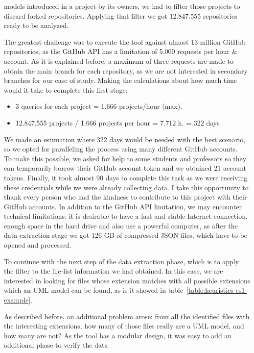 \documentclass[a4paper, 12pt]{book}
\begin{document}
models introduced in a project by its owners, we had to filter those projects to discard forked repositories. Applying that
filter we got 12.847.555 repositories ready to be analyzed.\par
The greatest challenge was to execute the tool against almost 13 million GitHub repositories, as the GitHub API has a limitation
of 5.000 requests per hour \& account. As it is explained before, a maximum of three requests are made to obtain the main
branch for each repository, as we are not interested in secondary branches for our case of study. Making the calculations about
how much time would it take to complete this first stage:
\begin{itemize}
  \item 3 queries for each project = 1.666 projects/hour (max).
  \item 12.847.555 projects / 1.666 projects per hour = 7.712 h. = 322 days
\end{itemize}
We made an estimation where 322 days would be needed with the best scenario, so we opted for paralleling the process using many
different GitHub accounts.\\
To make this possible, we asked for help to some students and professors so they can temporarily borrow their GitHub account
token and we obtained 21 account tokens. Finally, it took almost 90 days to complete this task as we were receiving these credentials
while we were already collecting data. I take this opportunity to thank every person who had the kindness to contribute to this project
with their GitHub accounts.
In addition to the GitHub API limitation, we may encounter technical limitations: it is desirable to have a fast and stable Internet
connection, enough space in the hard drive and also use a powerful computer, as after the data-extraction stage we got 126 GB of compressed
JSON files, which have to be opened and processed.\par
To continue with the next step of the data extraction phase, which is to apply the filter to the file-list information
we had obtained. In this case, we are interested in looking for files whose extension matches with all possible extensions which an
UML model can be found, as is it showed in table~\ref{table:heuristics-cs1-example}.\par
As described before, an additional problem arose: from all the identified files with the interesting extensions, how many of those files
really are a UML model, and how many are not? As the tool has a modular design, it was easy to add an additional phase to verify the data
\end{document}
